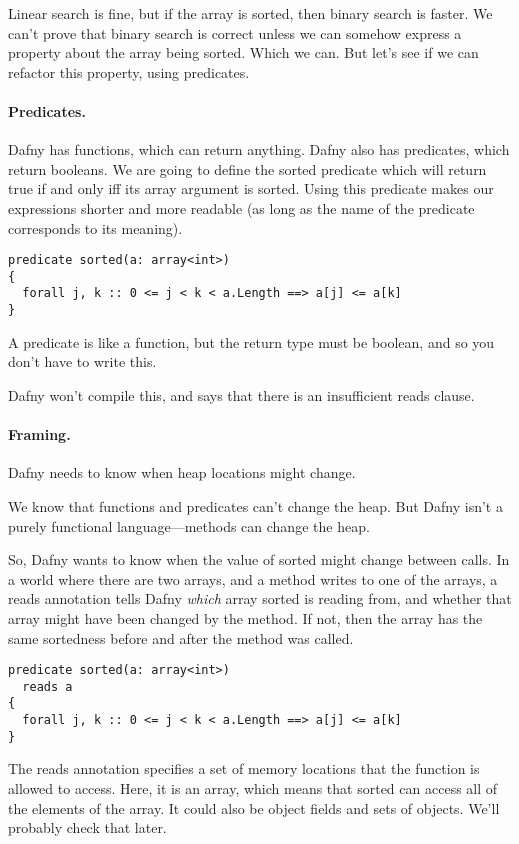 \documentclass[11pt]{article}
\begin{document}
Linear search is fine, but if the array is sorted, then binary search is faster. We can't
prove that binary search is correct unless we can somehow express a property about the array
being sorted. Which we can. But let's see if we can refactor this property, using predicates.

\paragraph{Predicates.} Dafny has functions, which can return anything. Dafny also has
predicates, which return booleans. We are going to define the \textsf{sorted} predicate
which will return true if and only iff its array argument is sorted. Using this predicate
makes our expressions shorter and more readable (as long as the name of the predicate
corresponds to its meaning).

\begin{lstlisting}[language=dafny]
predicate sorted(a: array<int>)
{
  forall j, k :: 0 <= j < k < a.Length ==> a[j] <= a[k]
}
\end{lstlisting}
A predicate is like a function, but the return type must be boolean, and so you don't have to write this.

Dafny won't compile this, and says that there is an insufficient \textsf{reads} clause.

\paragraph{Framing.} Dafny needs to know when heap locations might change.

We know that functions and predicates can't change the heap. But
Dafny isn't a purely functional language---methods can change the heap.

So, Dafny wants to know when the value of \textsf{sorted} might change
between calls. In a world where there are two arrays, and a method
writes to one of the arrays, a \textsf{reads} annotation tells
Dafny \emph{which} array \textsf{sorted} is reading from, and whether
that array might have been changed by the method. If not, then the
array has the same sortedness before and after the method was called.

\begin{lstlisting}[language=dafny]
predicate sorted(a: array<int>)
  reads a
{
  forall j, k :: 0 <= j < k < a.Length ==> a[j] <= a[k]
}
\end{lstlisting}
The \textsf{reads} annotation specifies a set of memory
locations that the function is allowed to access. Here, it is
an array, which means that \textsf{sorted} can access all
of the elements of the array. It could also be object fields and
sets of objects. We'll probably check that later.
\end{document}
